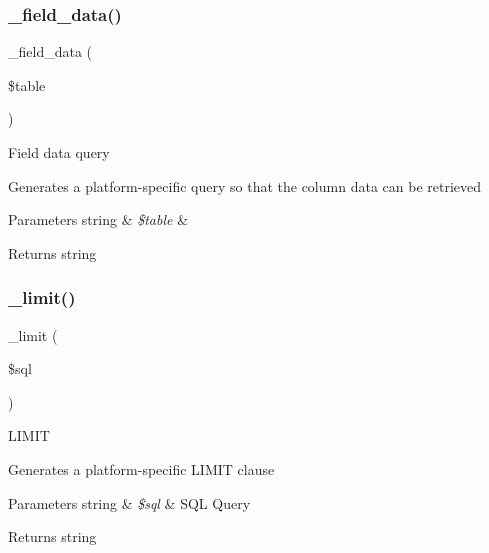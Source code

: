\subsubsection{\texorpdfstring{\+\_\+field\+\_\+data()}{\_field\_data()}}
{\footnotesize\ttfamily \+\_\+field\+\_\+data (\begin{DoxyParamCaption}\item[{}]{\$table }\end{DoxyParamCaption})\hspace{0.3cm}{\ttfamily [protected]}}

Field data query

Generates a platform-\/specific query so that the column data can be retrieved


\begin{DoxyParams}[1]{Parameters}
string & {\em \$table} & \\
\hline
\end{DoxyParams}
\begin{DoxyReturn}{Returns}
string 
\end{DoxyReturn}
\mbox{\label{class_c_i___d_b__pdo__4d__driver_a3a02ea06541b8ecc25a33a61651562c8}} 
\subsubsection{\texorpdfstring{\+\_\+limit()}{\_limit()}}
{\footnotesize\ttfamily \+\_\+limit (\begin{DoxyParamCaption}\item[{}]{\$sql }\end{DoxyParamCaption})\hspace{0.3cm}{\ttfamily [protected]}}

L\+I\+M\+IT

Generates a platform-\/specific L\+I\+M\+IT clause


\begin{DoxyParams}[1]{Parameters}
string & {\em \$sql} & S\+QL Query \\
\hline
\end{DoxyParams}
\begin{DoxyReturn}{Returns}
string 
\end{DoxyReturn}
\mbox{\label{class_c_i___d_b__pdo__4d__driver_a7ccb7f9c301fe7f0a9db701254142b63}} 
